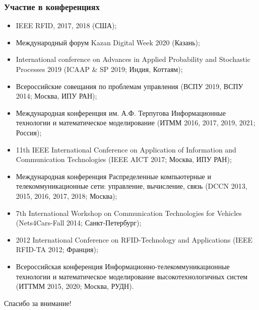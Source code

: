 
\begin{frame}
    \frametitle{Участие в конференциях}
    \footnotesize
    \begin{itemize}
        \item IEEE RFID, 2017, 2018 (США);
        \item Международный форум Kazan Digital Week 2020 (Казань);
        \item International conference on Advances in Applied Probability and Stochastic Processes 2019 (ICAAP \& SP 2019; Индия, Коттаям);
        \item Всероссийские совещания по проблемам управления (ВСПУ 2019, ВСПУ 2014; Москва, ИПУ РАН);
        \item Международная конференция им. А.Ф. Терпугова Информационные технологии и математическое моделирование (ИТММ 2016, 2017, 2019, 2021; Россия);
        \item 11th IEEE International Conference on Application of Information and Communication Technologies (IEEE AICT 2017; Москва, ИПУ РАН);
        \item Международная конференция Распределенные компьютерные и телекоммуникационные сети: управление, вычисление, связь (DCCN 2013, 2015, 2016, 2017, 2018; Москва);
        \item 7th International Workshop on Communication Technologies for Vehicles (Nets4Cars-Fall 2014; Санкт-Петербург);
        \item 2012 International Conference on RFID-Technology and Applications (IEEE RFID-TA 2012; Франция);
        \item Всероссийская конференция Информационно-телекоммуникационные технологии и математическое моделирование высокотехнологичных систем (ИТТММ 2015, 2020; Москва, РУДН).
    \end{itemize}
\end{frame}

\begin{frame} %
    \begin{center}
        \Huge
        Спасибо за внимание!
    \end{center}
\end{frame}
